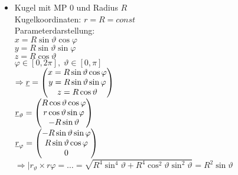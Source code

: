 \begin{itemize}
\item Kugel mit MP $0$ und Radius $R$\\
Kugelkoordinaten: $r=R=const$\\
Parameterdarstellung: \\
$x=R \sin \vartheta \cos \varphi$\\
$y=R \sin \vartheta \sin \varphi$\\
$z=R \cos \vartheta$\\
$\varphi \in [0,2\pi], \; \vartheta\in [0,\pi]$\\
$\Rightarrow \underline{r}=\begin{pmatrix}x=R \sin \vartheta \cos \varphi\\
y=R \sin \vartheta \sin \varphi\\
z=R \cos \vartheta\end{pmatrix}$\\
$\underline{r}_\vartheta=\begin{pmatrix}R \cos \vartheta \cos \varphi\\r\cos\vartheta \sin \varphi\\-R\sin\vartheta\end{pmatrix}$\\
$\underline{r}_\varphi = \begin{pmatrix}-R \sin \vartheta \sin \varphi \\ R \sin\vartheta \cos \varphi\\0\end{pmatrix}$\\
$\Rightarrow|r_\vartheta \times r\varphi=\dots = \sqrt{R^4\sin^4\vartheta + R^4\cos^2\vartheta \sin^2 \vartheta}=R^2\sin\vartheta$
\end{itemize}
